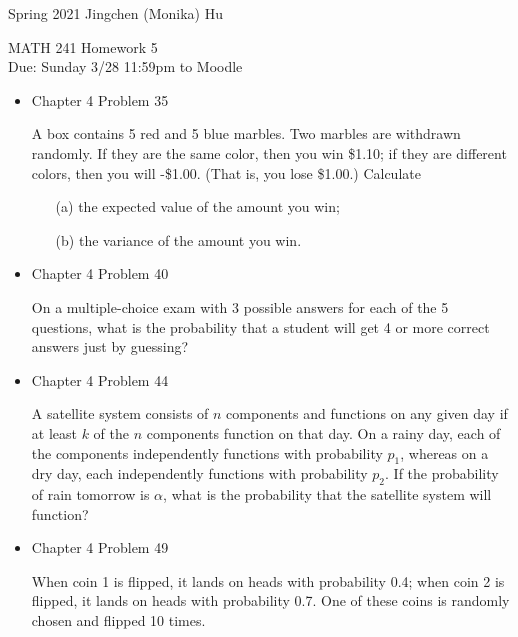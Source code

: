 \documentclass[11pt]{article}
\begin{document}
\enlargethispage{\baselineskip}

Spring 2021 \hfill Jingchen (Monika) Hu\\

\begin{center}
{\huge MATH 241 Homework 5}	\\
Due: Sunday 3/28 11:59pm to Moodle
\end{center}
\vspace{0.5cm}

\begin{itemize}

  
    \item
    Chapter 4 Problem  35
    
    A box contains 5 red and 5 blue marbles. Two marbles are withdrawn randomly. If they are the same color, then you win \$1.10; if they are different colors, then you will -\$1.00. (That is, you lose \$1.00.) Calculate
    
    \begin{itemize}
    \item[(a)] the expected value of the amount you win;
    \item[(b)] the variance of the amount you win.
    \end{itemize}

 \item
    Chapter 4 Problem 40
    
    On a multiple-choice exam with 3 possible answers for each of the 5 questions, what is the probability that a student will get 4 or more correct answers just by guessing?
    
    
    \item
    Chapter 4 Problem 44
    
    A satellite system consists of $n$ components and functions on any given day if at least $k$ of the $n$ components function on that day. On a rainy day, each of the components independently functions with probability $p_1$, whereas on a dry day, each independently functions with probability $p_2$. If the probability of rain tomorrow is $\alpha$, what is the probability that the satellite system will function?
    

    \item
    Chapter 4 Problem  49
    
    When coin 1 is flipped, it lands on heads with probability 0.4; when coin 2 is flipped, it lands on heads with probability 0.7. One of these coins is randomly chosen and flipped 10 times.
    

\end{itemize}
\end{document}
